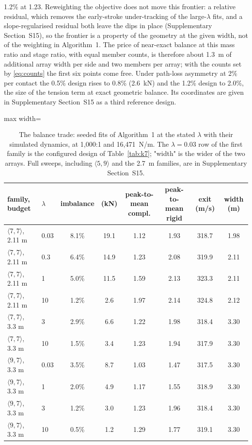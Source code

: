 \documentclass[preprint,12pt,number]{elsarticle}
\newcommand{\cfg}[2]{\langle #1,#2\rangle}
\newcommand{\ptm}{peak-to-mean}
\begin{document}
1.2\% at 1.23. Reweighting the objective does not move this frontier: a relative residual, which removes the early-stroke under-tracking of the large-$\lambda$ fits, and a slope-regularised residual both leave the dips in place (Supplementary Section~S15), so the frontier is a property of the geometry at the given width, not of the weighting in Algorithm~1. The price of near-exact balance at this mass ratio and stage ratio, with equal member counts, is therefore about 1.3~m of additional array width per side and two members per array; with the counts set by \eqref{eq:counts} the first six points come free. Under path-loss asymmetry at 2\% per contact the 0.5\% design rises to 0.8\% (2.6~kN) and the 1.2\% design to 2.0\%, the size of the tension term at exact geometric balance. Its coordinates are given in Supplementary Section~S15 as a third reference design.

\begin{table}[H]
\centering
\caption{The balance trade: seeded fits of Algorithm~1 at the stated $\lambda$ with their simulated dynamics, at 1,000:1 and 16,471~N/m. The $\lambda = 0.03$ row of the first family is the configured design of Table~\ref{tab:k7}; "width" is the wider of the two arrays. Full sweeps, including $\cfg{5}{9}$ and the 2.7~m families, are in Supplementary Section~S15.}
\label{tab:frontier}
\footnotesize
\begin{adjustbox}{max width=\linewidth}
\begin{tabular}{@{}llcccccc@{}}
\toprule
family, budget & $\lambda$ & imbalance & (kN) & \ptm{} compl. & \ptm{} rigid & exit (m/s) & width (m) \\
\midrule
$\cfg{7}{7}$, 2.11 m & 0.03 & 8.1\% & 19.1 & 1.12 & 1.93 & 318.7 & 1.98 \\
$\cfg{7}{7}$, 2.11 m & 0.3 & 6.4\% & 14.9 & 1.23 & 2.08 & 319.9 & 2.11 \\
$\cfg{7}{7}$, 2.11 m & 1 & 5.0\% & 11.5 & 1.59 & 2.13 & 323.3 & 2.11 \\
$\cfg{7}{7}$, 2.11 m & 10 & 1.2\% & 2.6 & 1.97 & 2.14 & 324.8 & 2.12 \\
$\cfg{7}{7}$, 3.3 m & 3 & 2.9\% & 6.6 & 1.22 & 1.98 & 318.4 & 3.30 \\
$\cfg{7}{7}$, 3.3 m & 10 & 1.5\% & 3.4 & 1.23 & 1.94 & 317.9 & 3.30 \\
$\cfg{9}{7}$, 3.3 m & 0.03 & 3.5\% & 8.7 & 1.03 & 1.47 & 317.5 & 3.30 \\
$\cfg{9}{7}$, 3.3 m & 1 & 2.0\% & 4.9 & 1.17 & 1.55 & 318.9 & 3.30 \\
$\cfg{9}{7}$, 3.3 m & 3 & 1.2\% & 3.0 & 1.23 & 1.96 & 318.4 & 3.30 \\
$\cfg{9}{7}$, 3.3 m & 10 & 0.5\% & 1.2 & 1.29 & 1.77 & 319.1 & 3.30 \\
\bottomrule
\end{tabular}
\end{adjustbox}
\end{table}
\end{document}
